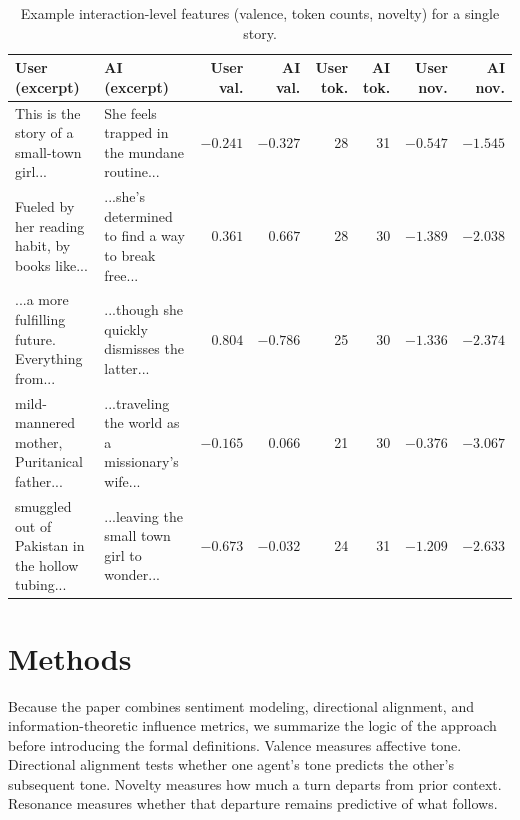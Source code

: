 \documentclass[11pt]{article}
\begin{document}
\begin{table}[t]
\centering
\scriptsize
\setlength{\tabcolsep}{3pt}
\renewcommand{\arraystretch}{1.15}
\begin{tabular}{p{} p{} r r r r r r}
\toprule
\textbf{User (excerpt)} & \textbf{AI (excerpt)} &
\textbf{User val.} & \textbf{AI val.} &
\textbf{User tok.} & \textbf{AI tok.} &
\textbf{User nov.} & \textbf{AI nov.} \\
\midrule
This is the story of a small-town girl... &
She feels trapped in the mundane routine... &
$-0.241$ & $-0.327$ & 28 & 31 & $-0.547$ & $-1.545$ \\
Fueled by her reading habit, by books like... &
...she's determined to find a way to break free... &
$0.361$ & $0.667$ & 28 & 30 & $-1.389$ & $-2.038$ \\
...a more fulfilling future. Everything from... &
...though she quickly dismisses the latter... &
$0.804$ & $-0.786$ & 25 & 30 & $-1.336$ & $-2.374$ \\
mild-mannered mother, Puritanical father... &
...traveling the world as a missionary's wife... &
$-0.165$ & $0.066$ & 21 & 30 & $-0.376$ & $-3.067$ \\
smuggled out of Pakistan in the hollow tubing... &
...leaving the small town girl to wonder... &
$-0.673$ & $-0.032$ & 24 & 31 & $-1.209$ & $-2.633$ \\
\bottomrule
\end{tabular}
\caption{Example interaction-level features (valence, token counts, novelty) for a single story.}
\label{tab:example_interaction_features}
\end{table}

\section{Methods}
Because the paper combines sentiment modeling, directional alignment, and information-theoretic influence metrics, we  summarize the logic of the approach before introducing the formal definitions. Valence measures affective tone. Directional alignment tests whether one agent's tone predicts the other's subsequent tone. Novelty measures how much a turn departs from prior context. Resonance measures whether that departure remains predictive of what follows.
\end{document}
